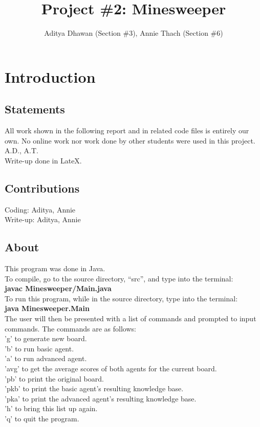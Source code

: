\documentclass[11pt]{article} %
\title{\textbf{Project \#2: Minesweeper}}
\author{Aditya Dhawan (Section \#3),  Annie Thach (Section \#6)}
\date{} %
\begin{document}
\maketitle

\section{\textbf{Introduction}}

\subsection{Statements}

All work shown in the following report and in related code files is entirely our own. No online work nor work done by other students were used in this project. A.D., A.T.\\

\noindent Write-up done in LateX.

\subsection{Contributions}

Coding: Aditya, Annie\\
Write-up: Aditya, Annie

\subsection{About}

This program was done in Java.\\
To compile, go to the source directory, “src”, and type into the terminal:\\
\indent \textbf{javac Minesweeper/Main.java}\\
To run this program, while in the source directory, type into the terminal:\\
\indent \textbf{java Minesweeper.Main}\\
The user will then be presented with a list of commands and prompted to input commands. The commands are as follows:\\
\indent 'g' to generate new board.\\
\indent 'b' to run basic agent.\\
\indent 'a' to run advanced agent.\\
\indent 'avg' to get the average scores of both agents for the current board.\\
\indent 'pb' to print the original board.\\
\indent 'pkb' to print the basic agent's resulting knowledge base.\\
\indent 'pka' to print the advanced agent's resulting knowledge base.\\
\indent 'h' to bring this list up again.\\
\indent 'q' to quit the program.\\
\end{document}
